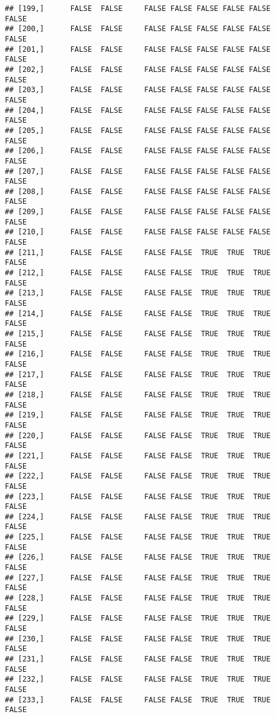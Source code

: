\documentclass[
]{article}
\begin{document}
\begin{verbatim}
## [199,]      FALSE  FALSE     FALSE FALSE FALSE FALSE FALSE         FALSE
## [200,]      FALSE  FALSE     FALSE FALSE FALSE FALSE FALSE         FALSE
## [201,]      FALSE  FALSE     FALSE FALSE FALSE FALSE FALSE         FALSE
## [202,]      FALSE  FALSE     FALSE FALSE FALSE FALSE FALSE         FALSE
## [203,]      FALSE  FALSE     FALSE FALSE FALSE FALSE FALSE         FALSE
## [204,]      FALSE  FALSE     FALSE FALSE FALSE FALSE FALSE         FALSE
## [205,]      FALSE  FALSE     FALSE FALSE FALSE FALSE FALSE         FALSE
## [206,]      FALSE  FALSE     FALSE FALSE FALSE FALSE FALSE         FALSE
## [207,]      FALSE  FALSE     FALSE FALSE FALSE FALSE FALSE         FALSE
## [208,]      FALSE  FALSE     FALSE FALSE FALSE FALSE FALSE         FALSE
## [209,]      FALSE  FALSE     FALSE FALSE FALSE FALSE FALSE         FALSE
## [210,]      FALSE  FALSE     FALSE FALSE FALSE FALSE FALSE         FALSE
## [211,]      FALSE  FALSE     FALSE FALSE  TRUE  TRUE  TRUE         FALSE
## [212,]      FALSE  FALSE     FALSE FALSE  TRUE  TRUE  TRUE         FALSE
## [213,]      FALSE  FALSE     FALSE FALSE  TRUE  TRUE  TRUE         FALSE
## [214,]      FALSE  FALSE     FALSE FALSE  TRUE  TRUE  TRUE         FALSE
## [215,]      FALSE  FALSE     FALSE FALSE  TRUE  TRUE  TRUE         FALSE
## [216,]      FALSE  FALSE     FALSE FALSE  TRUE  TRUE  TRUE         FALSE
## [217,]      FALSE  FALSE     FALSE FALSE  TRUE  TRUE  TRUE         FALSE
## [218,]      FALSE  FALSE     FALSE FALSE  TRUE  TRUE  TRUE         FALSE
## [219,]      FALSE  FALSE     FALSE FALSE  TRUE  TRUE  TRUE         FALSE
## [220,]      FALSE  FALSE     FALSE FALSE  TRUE  TRUE  TRUE         FALSE
## [221,]      FALSE  FALSE     FALSE FALSE  TRUE  TRUE  TRUE         FALSE
## [222,]      FALSE  FALSE     FALSE FALSE  TRUE  TRUE  TRUE         FALSE
## [223,]      FALSE  FALSE     FALSE FALSE  TRUE  TRUE  TRUE         FALSE
## [224,]      FALSE  FALSE     FALSE FALSE  TRUE  TRUE  TRUE         FALSE
## [225,]      FALSE  FALSE     FALSE FALSE  TRUE  TRUE  TRUE         FALSE
## [226,]      FALSE  FALSE     FALSE FALSE  TRUE  TRUE  TRUE         FALSE
## [227,]      FALSE  FALSE     FALSE FALSE  TRUE  TRUE  TRUE         FALSE
## [228,]      FALSE  FALSE     FALSE FALSE  TRUE  TRUE  TRUE         FALSE
## [229,]      FALSE  FALSE     FALSE FALSE  TRUE  TRUE  TRUE         FALSE
## [230,]      FALSE  FALSE     FALSE FALSE  TRUE  TRUE  TRUE         FALSE
## [231,]      FALSE  FALSE     FALSE FALSE  TRUE  TRUE  TRUE         FALSE
## [232,]      FALSE  FALSE     FALSE FALSE  TRUE  TRUE  TRUE         FALSE
## [233,]      FALSE  FALSE     FALSE FALSE  TRUE  TRUE  TRUE         FALSE

\end{verbatim}
\end{document}
